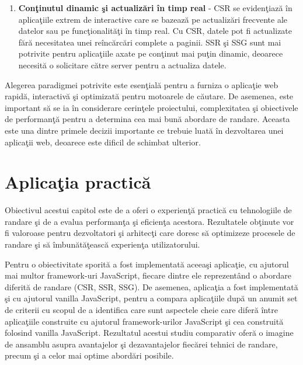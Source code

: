\documentclass[12pt, a4paper]{report}
\begin{document}
\begin{enumerate}
	\item \textbf{Con\c tinutul dinamic \c si actualiz\u ari \^in timp real} - CSR se eviden\c tiaz\u a \^in aplica\c tiile extrem de interactive care se bazeaz\u a pe actualiz\u ari frecvente ale datelor sau pe func\c tionalit\u a\c ti \^in timp real. Cu CSR, datele pot fi actualizate f\u ar\u a necesitatea unei re\^inc\u arc\u ari complete a paginii. SSR \c si SSG sunt mai potrivite pentru aplica\c tiile axate pe con\c tinut mai pu\c tin dinamic, deoarece necesit\u a o solicitare c\u atre server pentru a actualiza datele.
\end{enumerate}

Alegerea paradigmei potrivite este esen\c tial\u a pentru a furniza o aplica\c tie web rapid\u a, interactiv\u a \c si optimizat\u a pentru motoarele de c\u autare. De asemenea, este important s\u a se ia \^in considerare cerin\c tele proiectului, complexitatea \c si obiectivele de performan\c t\u a pentru a determina cea mai bun\u a abordare de randare. Aceasta este una dintre primele decizii importante ce trebuie luat\u a \^in dezvoltarea unei aplica\c tii web, deoarece este dificil de schimbat ulterior.

\chapter{Aplica\c tia practic\u a}

Obiectivul acestui capitol este de a oferi o experien\c t\u a practic\u a cu tehnologiile de randare \c si de a evalua performan\c ta \c si eficien\c ta acestora. Rezultatele ob\c tinute vor fi valoroase pentru dezvoltatori \c si arhitec\c ti care doresc s\u a optimizeze procesele de randare \c si s\u a \^imbun\u at\u a\c teasc\u a experien\c ta utilizatorului.


Pentru o obiectivitate sporit\u a a fost implementat\u a aceea\c si aplica\c tie, cu ajutorul mai multor framework-uri JavaScript, fiecare dintre ele reprezent\^and o abordare diferit\u a de randare (CSR, SSR, SSG). De asemenea, aplica\c tia a fost implementat\u a \c si cu ajutorul vanilla JavaScript, pentru a compara aplica\c tiile dup\u a un anumit set de criterii cu scopul de a identifica care sunt aspectele cheie care difer\u a \^intre aplica\c tiile construite cu ajutorul framework-urilor JavaScript \c si cea construit\u a folosind vanilla JavaScript. Rezultatul acestui studiu comparativ ofer\u a o imagine de ansamblu asupra avantajelor \c si dezavantajelor fiec\u arei tehnici de randare, precum \c si a celor mai optime abord\u ari posibile.
\end{document}
